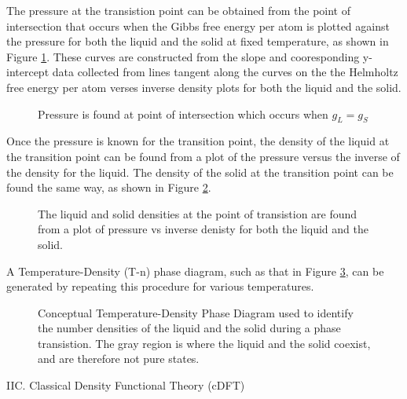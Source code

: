 \documentclass[12pt]{article}
\begin{document}
The pressure at the transistion point can be obtained from the point of intersection that occurs when the Gibbs free energy per atom is plotted against the pressure for both the liquid and the solid at fixed temperature, as shown in Figure \ref{fig:GibbsvsP}. These curves are constructed from the slope and cooresponding y-intercept data collected from lines tangent along the curves on the the Helmholtz free energy per atom verses inverse density plots for both the liquid and the solid. 
\begin{figure}[h!]
    \centering
    \caption{Pressure is found at point of intersection which occurs when $g_L=g_S$}
    \label{fig:GibbsvsP}
  \end{figure}


Once the pressure is known for the transition point, the density of the liquid at the transition point can be found from a plot of the pressure versus the inverse of the density for the liquid. The density of the solid at the transition point can be found the same way, as shown in Figure \ref{fig:Pvsinvn}.

\begin{figure}[h!]
    \centering
    \caption{The liquid and solid densities at the point of transistion are found from a plot of pressure vs inverse denisty for both the liquid and the solid.}
    \label{fig:Pvsinvn}
  \end{figure}

A Temperature-Density (T-n) phase diagram, such as that in Figure \ref{fig:T-n_Diagram}, can be generated by repeating this procedure for various temperatures. %

\begin{figure}[h!]
    \centering
    \caption{Conceptual Temperature-Density Phase Diagram used to identify the number densities of the liquid and the solid during a phase transistion. The gray region is where the liquid and the solid coexist, and are therefore not pure states.}
    \label{fig:T-n_Diagram}
  \end{figure} 
\[\]
\noindent IIC. Classical Density Functional Theory (cDFT)
\end{document}
